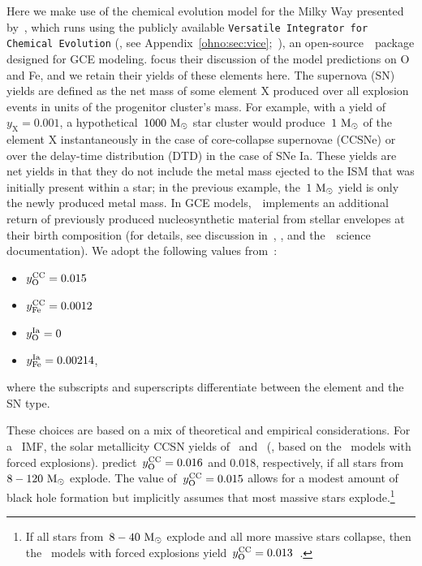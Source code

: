 Here we make use of the chemical evolution model for the Milky Way
presented by~\citet{Johnson2021}, which runs using the publicly available
\texttt{Versatile Integrator for Chemical Evolution}
(\vice, see Appendix~\ref{ohno:sec:vice};~\citealp{Johnson2020, Griffith2021b,
Johnson2021}), an open-source~\python~package designed for GCE modeling.
\citet{Johnson2021} focus their discussion of the model predictions on O and
Fe, and we retain their yields of these elements here.
The supernova (SN) yields are defined as the net mass of some element X
produced over all explosion events in units of the progenitor cluster's mass.
For example, with a yield of~$y_\text{X} = 0.001$, a hypothetical~$1000~\text{M}_\odot$
star cluster would produce~$1~\text{M}_\odot$ of the element X instantaneously in the
case of core-collapse supernovae (CCSNe) or over the delay-time distribution
(DTD) in the case of SNe Ia.
These yields are net yields in that they do not include the metal mass
ejected to the ISM that was initially present within a star; in the previous
example, the~$1~\text{M}_\odot$ yield is only the newly produced metal mass.
In GCE models,~\vice~implements an additional return of
previously produced nucleosynthetic material from stellar envelopes at their
birth composition (for details, see discussion in~\citealt{Johnson2020},
\citealt{Johnson2021}, and the~\vice~science documentation).
We adopt the following values from~\citet{Johnson2021}:
\begin{itemize}
	\item $y_\text{O}^\text{CC} = 0.015$

	\item $y_\text{Fe}^\text{CC} = 0.0012$

	\item $y_\text{O}^\text{Ia} = 0$

	\item $y_\text{Fe}^\text{Ia} = 0.00214$,
\end{itemize}
where the subscripts and superscripts differentiate between the element and the
SN type.
\par
These choices are based on a mix of theoretical and empirical considerations.
For a~\citet{Kroupa2001} IMF,
the solar metallicity CCSN yields of~\citet{Chieffi2013}
and~\citeauthor{Griffith2021b} (\citeyear{Griffith2021b}, based on
the~\citealt{Sukhbold2016} models with forced explosions).
predict~$y_\text{O}^\text{CC} = 0.016$ and 0.018, respectively, if all stars
from~$8 - 120~\text{M}_\odot$ explode.
The value of~$y_\text{O}^\text{CC} = 0.015$ allows for a modest amount of black hole
formation but implicitly assumes that most massive stars explode.\footnote{
	If all stars from~$8 - 40~\text{M}_\odot$ explode and all more massive stars
	collapse, then the~\citet{Sukhbold2016} models with forced explosions
	yield~$y_\text{O}^\text{CC} = 0.013$~\citep{Griffith2021b}.
}
